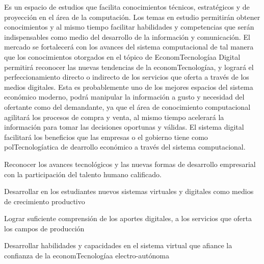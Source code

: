 \begin{syllabus}


\begin{justification}
Es un espacio de estudios que facilita conocimientos técnicos, estratégicos y de proyección en el área de la computación. Los temas en estudio permitirán obtener conocimientos y al mismo tiempo facilitar habilidades y competencias que serán indispensables como medio del desarrollo de la información y comunicación. El mercado se fortalecerá con los avances del sistema computacional de tal manera que los conocimientos otorgados en el tópico de EconomTecnologíaa Digital permitirá reconocer las nuevas tendencias de la economTecnologíaa, y logrará el perfeccionamiento directo o indirecto de los servicios que oferta a través de los medios digitales. Esta es probablemente uno de los mejores espacios del sistema económico moderno, podrá manipular la información a gusto y necesidad del ofertante como del demandante, ya que el área de conocimiento computacional agilitará los procesos de compra y venta, al mismo tiempo acelerará la información para tomar las decisiones oportunas y válidas. El sistema digital facilitará los beneficios que las empresas o el gobierno tiene como polTecnologíatica de dearrollo económico a través del sistema computacional.
\end{justification}

\begin{goals}
\item Reconocer los avances tecnológicos y las nuevas formas de desarrollo empresarial con la participación del talento humano calificado.
\item Desarrollar en los estudiantes nuevos sistemas virtuales y digitales como medios de crecimiento productivo
\item Lograr suficiente comprensión de los aportes digitales, a los servicios que oferta los campos de producción
\item Desarrollar habilidades y capacidades en el sistema virtual que afiance la confianza de la economTecnologíaa electro-autónoma
\end{goals}

\begin{outcomes}
\end{outcomes}


\end{syllabus}
